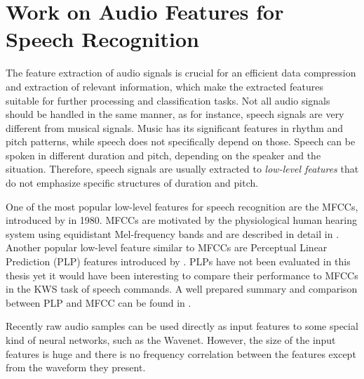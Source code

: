 
\section{Work on Audio Features for Speech Recognition}\label{sec:prev_features}
The feature extraction of audio signals is crucial for an efficient data compression and extraction of relevant information, which make the extracted features suitable for further processing and classification tasks.
Not all audio signals should be handled in the same manner, as for instance, speech signals are very different from musical signals.
Music has its significant features in rhythm and pitch patterns, while speech does not specifically depend on those.
Speech can be spoken in different duration and pitch, depending on the speaker and the situation.
Therefore, speech signals are usually extracted to \emph{low-level features} that do not emphasize specific structures of duration and pitch.

One of the most popular low-level features for speech recognition are the MFCCs, introduced by \cite{Mermelstein1980} in 1980.
MFCCs are motivated by the physiological human hearing system using equidistant Mel-frequency bands and are described in detail in .
Another popular low-level feature similar to MFCCs are Perceptual Linear Prediction (PLP) features introduced by \cite{Hermansky1987}.
PLPs have not been evaluated in this thesis yet it would have been interesting to compare their performance to MFCCs in the KWS task of speech commands.
A well prepared summary and comparison between PLP and MFCC can be found in \cite{Hoenig2005}.

Recently raw audio samples can be used directly as input features to some special kind of neural networks, such as the Wavenet. 
However, the size of the input features is huge and there is no frequency correlation between the features except from the waveform they present.
